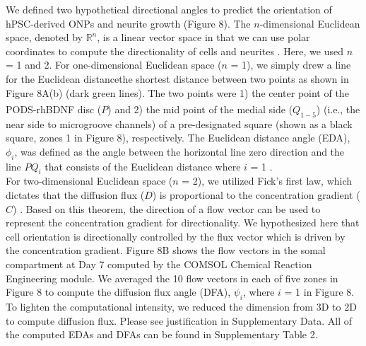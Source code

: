 \documentclass[review]{elsarticle}
\begin{document}
\indent We defined two hypothetical directional angles to predict the orientation of hPSC-derived ONPs and neurite growth (Figure 8). The $n$-dimensional Euclidean space, denoted by $\mathbb{R}^{n}$, is a linear vector space in that we can use polar coordinates to compute the directionality of cells and neurites \cite{Axler2015}. Here, we used $n$ = 1 and 2. For one-dimensional Euclidean space ($n$ = 1), we simply drew a line for the Euclidean distance\textemdash the shortest distance between two points as shown in Figure 8A(b) (dark green lines).  The two points were 1) the center point of the PODS\textsuperscript{\textregistered}-rhBDNF disc ($P$) and 2) the mid point of the medial side ($Q_{1-5}$) (i.e., the near side to microgroove channels) of a pre-designated square (shown as a black square, zones 1 in Figure 8), respectively. The Euclidean distance angle (EDA), $\phi_{i}$, was defined as the angle between the horizontal line zero direction and the line $PQ_{i}$ that consists of the Euclidean distance where $i$ = 1 .\\
\indent For two-dimensional Euclidean space ($n$ = 2), we utilized Fick's first law, which dictates that the diffusion flux ($D$) is proportional to the concentration gradient ($C$) \cite{crank1979}. Based on this theorem, the direction of a flow vector can be used to represent the concentration gradient for directionality. We hypothesized here that cell orientation is directionally controlled by the flux vector which is driven by the concentration gradient. Figure 8B shows the flow vectors in the somal compartment at Day 7 computed by the COMSOL Chemical Reaction Engineering module.  We averaged the 10 flow vectors in each of five zones in Figure 8 to compute the diffusion flux angle (DFA), $\psi_{i}$, where $i$ = 1 in Figure 8. To lighten the computational intensity, we reduced the dimension from 3D to 2D to compute diffusion flux. Please see justification in Supplementary Data. All of the computed EDAs and DFAs can be found in Supplementary Table 2. 
\end{document}
